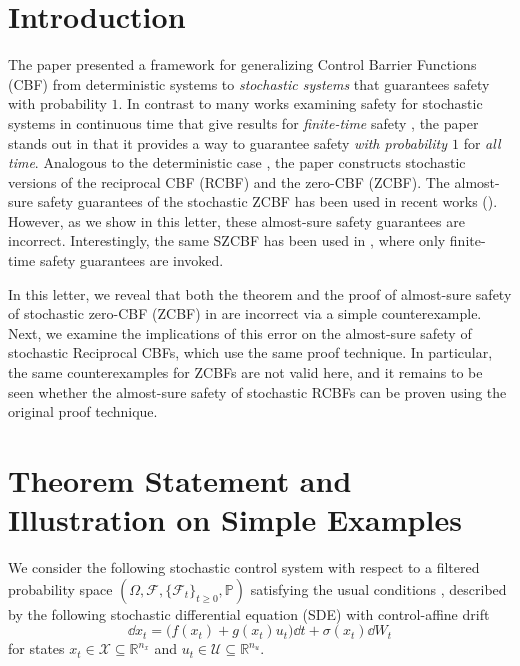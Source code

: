 \documentclass[twocolumn,amsthm]{autart}
\newcommand*{\XSet}{\mathcal{X}}
\newcommand*{\USet}{\mathcal{U}}
\begin{document}
\section{Introduction}
The paper \cite{clark2021control} presented a framework for generalizing Control Barrier Functions (CBF) from deterministic systems to \textit{stochastic systems} that guarantees safety with probability $1$. In contrast to many works examining safety for stochastic systems in continuous time that give results for \textit{finite-time} safety \cite{prajna2004stochastic,prajna2007framework,wang2021safety,black2023safety,abel2023prescribed}, the paper \cite{clark2021control} stands out in that it provides a way to guarantee safety \textit{with probability $1$} for \textit{all time}. Analogous to the deterministic case \cite{ames2016control}, the paper \cite{clark2021control} constructs stochastic versions of the reciprocal CBF (RCBF) and the zero-CBF (ZCBF). The almost-sure safety guarantees of the stochastic ZCBF has been used in recent works (\cite{pereira2021safe,song2022generalization,vahs2023non,vahs2023risk,enwerem2023safe}). However, as we show in this letter, these almost-sure safety guarantees are incorrect. Interestingly, the same SZCBF has been used in \cite{wang2021safety}, where only finite-time safety guarantees are invoked.

In this letter, we reveal that both the theorem and the proof of almost-sure safety of stochastic zero-CBF (ZCBF) in \cite[Theorem 3]{clark2021control} are incorrect via a simple counterexample.
Next, we examine the implications of this error on the almost-sure safety of stochastic Reciprocal CBFs, which use the same proof technique. In particular, the same counterexamples for ZCBFs are not valid here, and it remains to be seen whether the almost-sure safety of stochastic RCBFs can be proven using the original proof technique.

\section{Theorem Statement and Illustration on Simple Examples}
We consider the following stochastic control system with respect to a filtered probability space $(\Omega, \mathcal{F}, \{\mathcal{F}_t\}_{t \geq 0}, \mathbb{P})$ satisfying the usual conditions \cite{karatzas2012brownian}, described by the following stochastic differential equation (SDE) with control-affine drift
\begin{equation} \label{eq:sde}
    \dd{x}_t = \Big( f(x_t) + g(x_t) u_t \Big) \dd{t} + \sigma(x_t) \dd{W}_t
\end{equation}
for states $x_t \in \XSet \subseteq \mathbb{R}^{n_x}$ and $u_t \in \USet \subseteq \mathbb{R}^{n_u}$.
\end{document}
